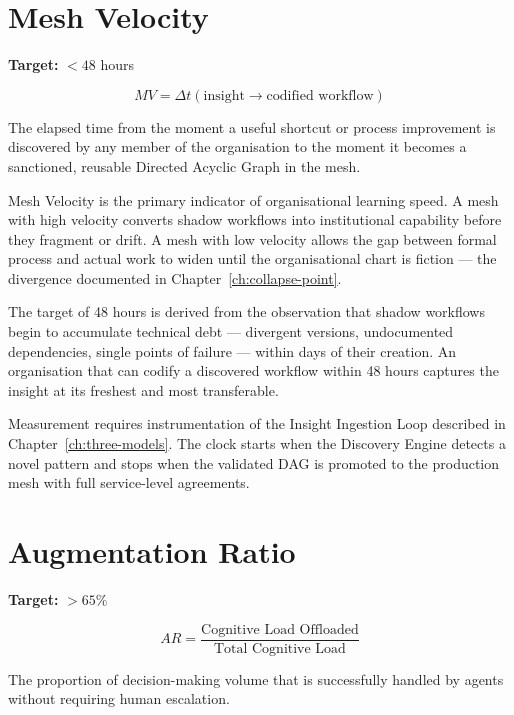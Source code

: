 \section{Mesh Velocity}

\begin{definitionbox}[title={Mesh Velocity (MV)}]
\textbf{Target:} $< 48$ hours

\[
MV = \Delta t \left( \text{insight} \rightarrow \text{codified workflow} \right)
\]

The elapsed time from the moment a useful shortcut or process improvement is discovered by any member of the organisation to the moment it becomes a sanctioned, reusable Directed Acyclic Graph in the mesh.
\end{definitionbox}

Mesh Velocity is the primary indicator of organisational learning speed. A mesh with high velocity converts shadow workflows into institutional capability before they fragment or drift. A mesh with low velocity allows the gap between formal process and actual work to widen until the organisational chart is fiction --- the divergence documented in Chapter~\ref{ch:collapse-point}.

The target of 48 hours is derived from the observation that shadow workflows begin to accumulate technical debt --- divergent versions, undocumented dependencies, single points of failure --- within days of their creation. An organisation that can codify a discovered workflow within 48 hours captures the insight at its freshest and most transferable.

Measurement requires instrumentation of the Insight Ingestion Loop described in Chapter~\ref{ch:three-models}. The clock starts when the Discovery Engine detects a novel pattern and stops when the validated DAG is promoted to the production mesh with full service-level agreements.

\section{Augmentation Ratio}

\begin{definitionbox}[title={Augmentation Ratio (AR)}]
\textbf{Target:} $> 65\%$

\[
AR = \frac{\text{Cognitive Load Offloaded}}{\text{Total Cognitive Load}}
\]

The proportion of decision-making volume that is successfully handled by agents without requiring human escalation.
\end{definitionbox}

